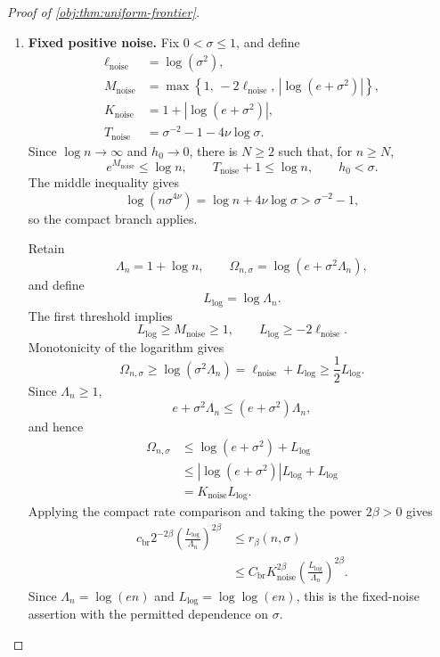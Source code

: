 \documentclass[11pt]{article}
\begin{document}
\begin{proof}[Proof of \cref{obj:thm:uniform-frontier}]
\begin{enumerate}
For \(a\ge1/\nu\), monotonicity in the exponent for \(n>1\) gives
\[
0<n^{-a}\le n^{-1/\nu}=h_0\le1.
\]
Hence the exact direct branch applies for every \(n\ge2\), with
\[
h_\star(n,n^{-a})=h_0,
\qquad
r_\beta(n,n^{-a})=n^{-\beta/\nu}.
\]

\item \textbf{Fixed positive noise.}
Fix \(0<\sigma\le1\), and define
\[
\begin{aligned}
\ell_{\mathrm{noise}}&=\log(\sigma^2),\\
M_{\mathrm{noise}}&=\max\left\{
1,\,-2\ell_{\mathrm{noise}},\,|\log(e+\sigma^2)|
\right\},\\
K_{\mathrm{noise}}&=1+|\log(e+\sigma^2)|,\\
T_{\mathrm{noise}}&=\sigma^{-2}-1-4\nu\log\sigma.
\end{aligned}
\]
Since \(\log n\to\infty\) and \(h_0\to0\), there is \(N\ge2\) such that, for
\(n\ge N\),
\[
e^{M_{\mathrm{noise}}}\le\log n,\qquad
T_{\mathrm{noise}}+1\le\log n,\qquad
h_0<\sigma.
\]
The middle inequality gives
\[
\log(n\sigma^{4\nu})
=\log n+4\nu\log\sigma
>\sigma^{-2}-1,
\]
so the compact branch applies.

Retain
\[
\Lambda_n=1+\log n,\qquad
\Omega_{n,\sigma}=\log(e+\sigma^2\Lambda_n),
\]
and define
\[
L_{\mathrm{log}}=\log\Lambda_n.
\]
The first threshold implies
\[
L_{\mathrm{log}}\ge M_{\mathrm{noise}}\ge1,
\qquad
L_{\mathrm{log}}\ge-2\ell_{\mathrm{noise}}.
\]
Monotonicity of the logarithm gives
\[
\Omega_{n,\sigma}
\ge\log(\sigma^2\Lambda_n)
=\ell_{\mathrm{noise}}+L_{\mathrm{log}}
\ge\frac12L_{\mathrm{log}}.
\]
Since \(\Lambda_n\ge1\),
\[
e+\sigma^2\Lambda_n\le(e+\sigma^2)\Lambda_n,
\]
and hence
\[
\begin{aligned}
\Omega_{n,\sigma}
&\le\log(e+\sigma^2)+L_{\mathrm{log}}\\
&\le|\log(e+\sigma^2)|L_{\mathrm{log}}+L_{\mathrm{log}}\\
&=K_{\mathrm{noise}}L_{\mathrm{log}}.
\end{aligned}
\]
Applying the compact rate comparison and taking the power \(2\beta>0\) gives
\[
\begin{aligned}
c_{\mathrm{br}}2^{-2\beta}
\left(\frac{L_{\mathrm{log}}}{\Lambda_n}\right)^{2\beta}
&\le r_\beta(n,\sigma)\\
&\le
C_{\mathrm{br}}K_{\mathrm{noise}}^{2\beta}
\left(\frac{L_{\mathrm{log}}}{\Lambda_n}\right)^{2\beta}.
\end{aligned}
\]
Since \(\Lambda_n=\log(en)\) and \(L_{\mathrm{log}}=\log\log(en)\), this is the
fixed-noise assertion with the permitted dependence on \(\sigma\).


\end{enumerate}
\end{proof}
\end{document}
